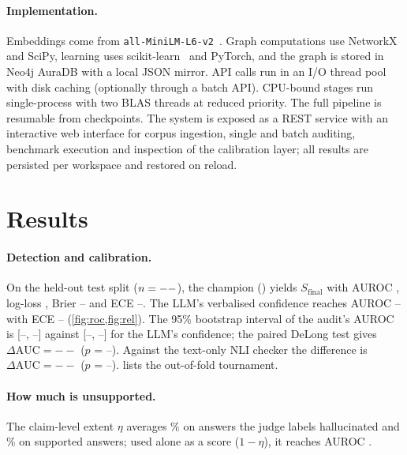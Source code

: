 \documentclass[10pt,twocolumn]{article}
\theoremstyle{remark}
\newcommand{\TestBrier}{--}\newcommand{\TestECE}{--}\newcommand{\TestAcc}{--}\newcommand{\LLMAUC}{--}
\newcommand{\LLMECE}{--}\newcommand{\Alpha}{--}\newcommand{\Coverage}{--}\newcommand{\CoverageSup}{--}
\newcommand{\TestAUCLo}{--}\newcommand{\TestAUCHi}{--}\newcommand{\LLMAUCLo}{--}\newcommand{\LLMAUCHi}{--}
\newcommand{\DeltaLLM}{--}\newcommand{\PvalLLM}{--}\newcommand{\DeltaText}{--}\newcommand{\PvalText}{--}
\newcommand{\TableLeaderboard}{}\newcommand{\TableAblation}{}\newcommand{\TableFeatures}{}\newcommand{\TablePercat}{}\newcommand{\TableKgprec}{}
\newcommand{\TableSens}{}\newcommand{\TableTripleweights}{}}
\begin{document}
\paragraph{Implementation.}
Embeddings come from \texttt{all-MiniLM-L6-v2}~\cite{reimers2019sbert}. Graph computations use NetworkX and SciPy,
learning uses scikit-learn~\cite{pedregosa2011sklearn} and PyTorch, and the graph is stored in Neo4j AuraDB with a
local JSON mirror. API calls run in an I/O thread pool with disk caching (optionally through a batch API).
CPU-bound stages run single-process with two BLAS threads at reduced priority. The full pipeline is resumable from
checkpoints. The system is exposed as a REST service with an interactive web interface for corpus ingestion, single
and batch auditing, benchmark execution and inspection of the calibration layer; all results are persisted per
workspace and restored on reload.

\section{Results}
\label{sec:results}

\TableLeaderboard
\TableAblation

\paragraph{Detection and calibration.}
On the held-out test split ($n=--$), the champion (\Champion) yields $S_{\mathrm{final}}$ with AUROC \TestAUC,
log-loss \TestLL, Brier \TestBrier{} and ECE \TestECE. The LLM's verbalised confidence reaches AUROC \LLMAUC{} with
ECE \LLMECE{} (\cref{fig:roc,fig:rel}). The 95\% bootstrap interval of the audit's AUROC is
[\TestAUCLo, \TestAUCHi] against [\LLMAUCLo, \LLMAUCHi] for the LLM's confidence; the paired DeLong test gives
$\Delta\mathrm{AUC}=\DeltaLLM$ ($p$ = \PvalLLM). Against the text-only NLI checker the difference is
$\Delta\mathrm{AUC}=\DeltaText$ ($p$ = \PvalText).  lists the out-of-fold tournament.

\TableKgprec
\TableTripleweights
\TableSens

\paragraph{How much is unsupported.}
The claim-level extent $\eta$ averages \ExtentHal\% on answers the judge labels hallucinated and \ExtentSup\% on
supported answers; used alone as a score ($1-\eta$), it reaches AUROC \ExtentAUC.
\end{document}
